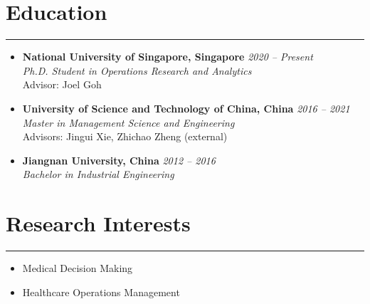 \documentclass[12pt, a4paper]{article}
\begin{document}
{\small

\section*{Education}
\vspace*{0.4em}
\hrule height 0.4pt
 \begin{itemize}[leftmargin=20pt, itemsep=6pt, parsep=0.2pt, topsep=1pt]

	\item[] \textbf{National University of Singapore, Singapore} \hfill \textit{2020 -- Present} \\
	\textit{Ph.D. Student in Operations Research and Analytics} \\
	Advisor: Joel Goh

	\item[] \textbf{University of Science and Technology of China, China} \hfill \textit{2016 -- 2021} \\
	\textit{Master in Management Science and Engineering} \\
	Advisors: Jingui Xie, Zhichao Zheng (external)

	\item[] \textbf{Jiangnan University, China} \hfill \textit{2012 -- 2016} \\
	\textit{Bachelor in Industrial Engineering}

\end{itemize}




\section*{Research Interests}
\vspace*{0.4em}
\hrule height 0.5pt
\begin{itemize}[leftmargin=36pt, itemsep=6pt, parsep=0.2pt, topsep=1pt]

	\item Medical Decision Making
	
	\item Healthcare Operations Management
	

\end{itemize}}
\end{document}
